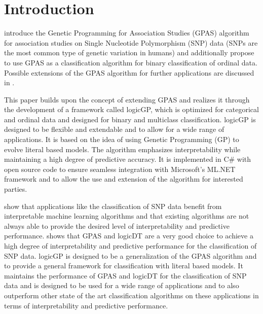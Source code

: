 \documentclass[dvipsnames,format=sigconf,anonymous=false,review=false]{acmart}
\begin{document}
\section{Introduction}

\citet{10.1093/bioinformatics/btm522} introduce the Genetic Programming for Association Studies (GPAS) algorithm for association studies on Single Nucleotide Polymorphism (SNP) data (SNPs are the most common type of genetic variation in humans) and additionally propose to use GPAS as a classification algorithm for binary classification of ordinal data. Possible extensions of the GPAS algorithm for further applications are discussed in \cite{Nunkesser2008b,bioinformatics24}. %

This paper builds upon the concept of extending GPAS and realizes it through the development of a framework called logicGP, which is optimized for categorical and ordinal data and designed for binary and multiclass classification. logicGP is designed to be flexible and extendable and to allow for a wide range of applications. It is based on the idea of using Genetic Programming (GP) to evolve literal based models. The algorithm emphasizes interpretability while maintaining a high degree of predictive accuracy. It is implemented in C\# with open source code to ensure seamless integration with Microsoft's ML.NET framework \cite{10.1145/3292500.3330667} and to allow the use and extension of the algorithm for interested parties.

\citet{lau_logicdt_2024} show that applications like the classification of SNP data benefit from interpretable machine learning algorithms and that existing algorithms are not always able to provide the desired level of interpretability and predictive performance. \citet{bioinformatics24} shows that GPAS and logicDT \cite{lau_logicdt_2024} are a very good choice to achieve a high degree of interpretability and predictive performance for the classification of SNP data. logicGP is designed to be a generalization of the GPAS algorithm and to provide a general framework for classification with literal based models. It maintains the performance of GPAS and logicDT for the classification of SNP data and is designed to be used for a wide range of applications and to also outperform other state of the art classification algorithms on these applications in terms of interpretability and predictive performance.   
\end{document}

